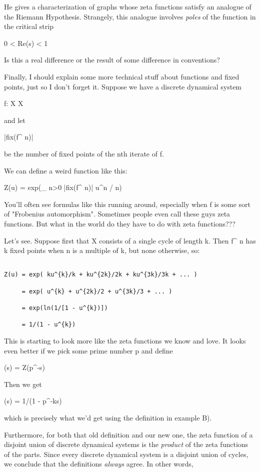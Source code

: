 He gives a characterization of graphs whose zeta functions satisfy an 
analogue of the Riemann Hypothesis.  Strangely, this analogue involves 
\emph{poles} of the \zeta  function in the critical strip  

0 < Re(s) < 1

Is this a real difference or the result of some difference in conventions?

Finally, I should explain some more technical stuff about \zeta  functions 
and fixed points, just so I don't forget it.  Suppose we have a discrete 
dynamical system

f: X \to  X

and let 

|fix(f^{ n})| 

be the number of fixed points of the nth iterate of f.

We can define a weird function like this:

Z(u) = exp(\sum_{ n>0} |fix(f^{ n})| u^{n} / n)

You'll often see formulas like this running around, especially when f is 
some sort of "Frobenius automorphism".  Sometimes people even call these 
guys zeta functions.  But what in the world do they have to do with zeta 
functions???

Let's see.  Suppose first that X consists of a single cycle of length k.  
Then f^{ n} has k fixed points when n is a multiple of k, but none otherwise, so: 


\begin{verbatim}

Z(u) = exp( ku^{k}/k + ku^{2k}/2k + ku^{3k}/3k + ... )
 
     = exp( u^{k} + u^{2k}/2 + u^{3k}/3 + ... )

     = exp(ln(1/[1 - u^{k})])

     = 1/(1 - u^{k})
\end{verbatim}
    
This is starting to look more like the zeta functions we know and love.
It looks even better if we pick some prime number p and define

\zeta (s) = Z(p^{-s})

Then we get

\zeta (s) = 1/(1 - p^{-ks})

which is precisely what we'd get using the definition in example B). 
 
Furthermore, for both that old definition and our new one, the zeta
function of a disjoint union of discrete dynamical systems is the 
\emph{product} of the zeta functions of the parts.  Since every discrete 
dynamical system is a disjoint union of cycles, we conclude that the
definitions \emph{always} agree.  In other words, 

